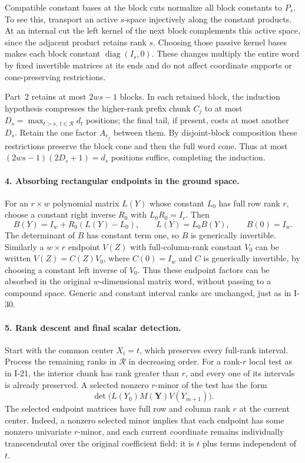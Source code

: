 Compatible constant bases at the block cuts normalize all
block constants to $P_s$.  To see this, transport an active
$s$-space injectively along the constant products.  At an
internal cut the left kernel of the next block complements
this active space, since the adjacent product retains rank
$s$.  Choosing those passive kernel bases makes each block
constant $\operatorname{diag}(I_s,0)$.
These changes multiply the entire word by fixed invertible
matrices at its ends and do not affect coordinate supports
or cone-preserving restrictions.

Part~2 retains at most $2ws-1$ blocks.  In each retained
block, the induction hypothesis compresses the higher-rank
prefix chunk $C_j$ to at most
$D_s=\max_{t>s,\ t\in\mathcal R}d_t$ positions; the final
tail, if present, costs at most another $D_s$.  Retain the
one factor $A_{e_j}$ between them.  By disjoint-block
composition these restrictions preserve the block cone and
then the full word cone.  Thus at most
$(2ws-1)(2D_s+1)=d_s$ positions suffice, completing the
induction.

\paragraph{4. Absorbing rectangular endpoints in the ground space.}
For an $r\times w$ polynomial matrix $L(Y)$ whose constant
$L_0$ has full row rank $r$, choose a constant right inverse
$R_0$ with $L_0R_0=I_r$.  Then
\[
 B(Y)=I_w+R_0(L(Y)-L_0),\qquad
 L(Y)=L_0B(Y),\qquad B(0)=I_w.
 \tag{I.53}
\]
The determinant of $B$ has constant term one, so $B$ is
generically invertible.  Similarly a $w\times r$ endpoint
$V(Z)$ with full-column-rank constant $V_0$ can be written
$V(Z)=C(Z)V_0$, where $C(0)=I_w$ and $C$ is generically
invertible, by choosing a constant left inverse of $V_0$.
Thus these endpoint factors can be absorbed in the original
$w$-dimensional matrix word, without passing to a compound
space.  Generic and constant interval ranks are unchanged,
just as in I-30.

\paragraph{5. Rank descent and final scalar detection.}
Start with the common center $X_i=t$, which preserves every
full-rank interval.  Process the remaining ranks in
$\mathcal R$ in decreasing order.  For a rank-$r$ local test
as in I-21, the interior chunk has rank greater than $r$,
and every one of its intervals is already preserved.
A selected nonzero $r$-minor of the test has the form
\[
 \det\bigl(L(Y_0)M(\mathbf Y)V(Y_{m+1})\bigr).
\]
The selected endpoint matrices have full row and column
rank $r$ at the current center.  Indeed, a nonzero selected
minor implies that each endpoint has some nonzero
univariate $r$-minor, and each current coordinate remains
individually transcendental over the original coefficient
field: it is $t$ plus terms independent of $t$.

